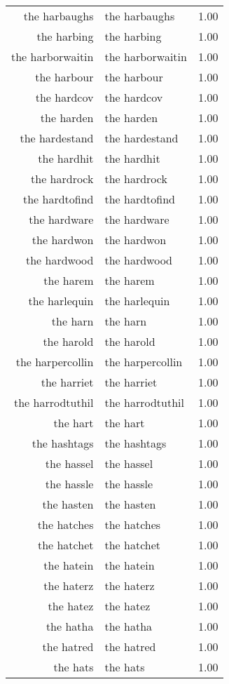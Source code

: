 \begin{table}[ht]
\begin{tabular}{rlr}
  the harbaughs & the harbaughs & 1.00 \\ 
  the harbing & the harbing & 1.00 \\ 
  the harborwaitin & the harborwaitin & 1.00 \\ 
  the harbour & the harbour & 1.00 \\ 
  the hardcov & the hardcov & 1.00 \\ 
  the harden & the harden & 1.00 \\ 
  the hardestand & the hardestand & 1.00 \\ 
  the hardhit & the hardhit & 1.00 \\ 
  the hardrock & the hardrock & 1.00 \\ 
  the hardtofind & the hardtofind & 1.00 \\ 
  the hardware & the hardware & 1.00 \\ 
  the hardwon & the hardwon & 1.00 \\ 
  the hardwood & the hardwood & 1.00 \\ 
  the harem & the harem & 1.00 \\ 
  the harlequin & the harlequin & 1.00 \\ 
  the harn & the harn & 1.00 \\ 
  the harold & the harold & 1.00 \\ 
  the harpercollin & the harpercollin & 1.00 \\ 
  the harriet & the harriet & 1.00 \\ 
  the harrodtuthil & the harrodtuthil & 1.00 \\ 
  the hart & the hart & 1.00 \\ 
  the hashtags & the hashtags & 1.00 \\ 
  the hassel & the hassel & 1.00 \\ 
  the hassle & the hassle & 1.00 \\ 
  the hasten & the hasten & 1.00 \\ 
  the hatches & the hatches & 1.00 \\ 
  the hatchet & the hatchet & 1.00 \\ 
  the hatein & the hatein & 1.00 \\ 
  the haterz & the haterz & 1.00 \\ 
  the hatez & the hatez & 1.00 \\ 
  the hatha & the hatha & 1.00 \\ 
  the hatred & the hatred & 1.00 \\ 
  the hats & the hats & 1.00 \\ 

\end{tabular}
\end{table}
